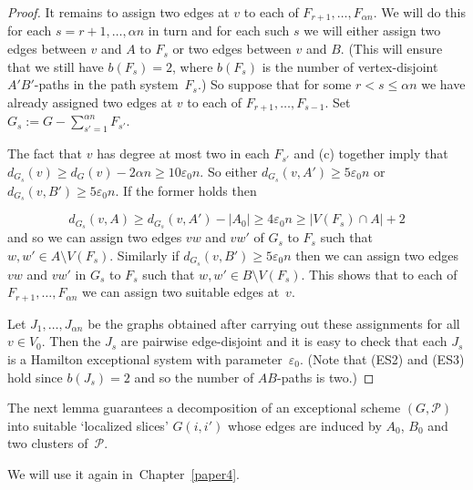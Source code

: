 \documentclass{memo-l}
\def\COMMENT#1{}
\def\eps{\varepsilon}
\def\epszero{\eps_0}
\numberwithin{section}{chapter}
\numberwithin{equation}{section}
\numberwithin{firstthm}{section}
\numberwithin{figure}{section}
\begin{document}
\begin{proof}
It remains to assign two edges at $v$ to each of $F_{r+1},\dots,F_{\alpha n}$. We will do this for each $s=r+1,\dots, \alpha n$
in turn and for each such $s$ we will either assign two edges between $v$ and $A$ to $F_s$ or two edges between $v$ and $B$.
(This will ensure that we still have $b(F_s)=2$, where $b(F_s)$ is the number of vertex-disjoint $A'B'$-paths in the path system~$F_s$.)
So suppose that for some $r<s\le \alpha n$ we have already assigned  two edges at $v$ to each of $F_{r+1}, \dots ,F_{s-1}$.
Set $G_s := G - \sum_{s'=1}^{\alpha n} F_{s'}$.%
    \COMMENT{We really want to sum over all $F_{s'}$ here.}
The fact that $v$ has degree at most two in each $F_{s'}$ and (c) together imply that
$d_{G_s}(v) \ge d_{G}(v) - 2 \alpha n \ge 10\epszero n$. So either $d_{G_s}(v,A')\ge 5\eps_0 n$ or $d_{G_s}(v,B')\ge 5\eps_0 n$.
If the former holds then%
\COMMENT{Deryk: had $A'$ instead of $A_0$ here}
$$d_{G_s}(v,A) \ge d_{G_s}(v,A')-|A_0|\ge 4\eps_0 n \ge |V(F_s) \cap A|+2$$
and so we can assign two edges $vw$ and $vw'$ of $G_s$ to $F_s$ such that $w,w' \in A \setminus V(F_s)$.
Similarly if $d_{G_s}(v,B')\ge 5\eps_0 n$ then we can assign two edges $vw$ and $vw'$ in $G_s$ to $F_s$ such that $w,w' \in  B \setminus V(F_s)$.
This shows that to each of $F_{r+1},\dots,F_{\alpha n}$ we can assign two suitable edges at~$v$. 

Let $J_1,\dots,J_{\alpha n}$ be the graphs obtained after carrying out these assignments for all $v\in V_0$.
Then the $J_s$ are pairwise edge-disjoint and it is easy to check that each $J_s$ is a Hamilton exceptional system with parameter~$\eps_0$.
(Note that (ES2) and (ES3) hold since $ b(J_s)=2$ and so the number of $AB$-paths is two.)%
\COMMENT{Deryk: previously had $e_{(J_s)^*_{AB}}(A,B)=b(J_s)=2$, but it seems nicer to check ES2 without the additional notation}
\end{proof}

The next lemma guarantees a decomposition of an exceptional scheme $(G, \mathcal{P})$ into suitable `localized slices' $G(i,i')$ whose edges are induced by
$A_0$, $B_0$ and two clusters of~$\mathcal{P}$.%
   \COMMENT{Daniela: replaced "of a given partition" by "of~$\mathcal{P}$}
We will use it again in~Chapter~\ref{paper4}.
\end{document}
